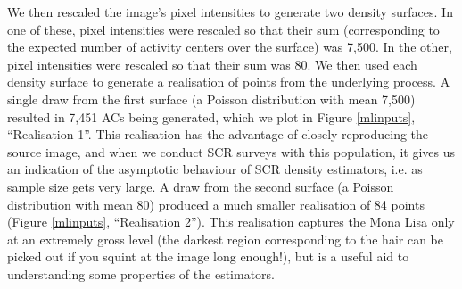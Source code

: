 \documentclass[10pt,a4paper]{article}
\begin{document}
We then rescaled the image's pixel intensities to generate two density surfaces. In one of these, pixel intensities were rescaled so that their sum (corresponding to the expected number of activity centers over the surface) was 7,500. In the other, pixel intensities were rescaled so that their sum was 80. We then used each density surface to generate a realisation of points from the underlying process. A single draw from the first surface (a Poisson distribution with mean 7,500) resulted in 7,451 ACs being generated, which we plot in Figure \ref{mlinputs}, ``Realisation 1''. This realisation has the advantage of closely reproducing the source image, and when we conduct SCR surveys with this population, it gives us an indication of the asymptotic behaviour of SCR density estimators, i.e. as sample size gets very large. A draw from the second surface (a Poisson distribution with mean 80) produced a much smaller realisation of 84 points (Figure \ref{mlinputs}, ``Realisation 2''). This realisation captures the Mona Lisa only at an extremely gross level (the darkest region corresponding to the hair can be picked out if you squint at the image long enough!), but is a useful aid to understanding some properties of the estimators.

\end{document}
